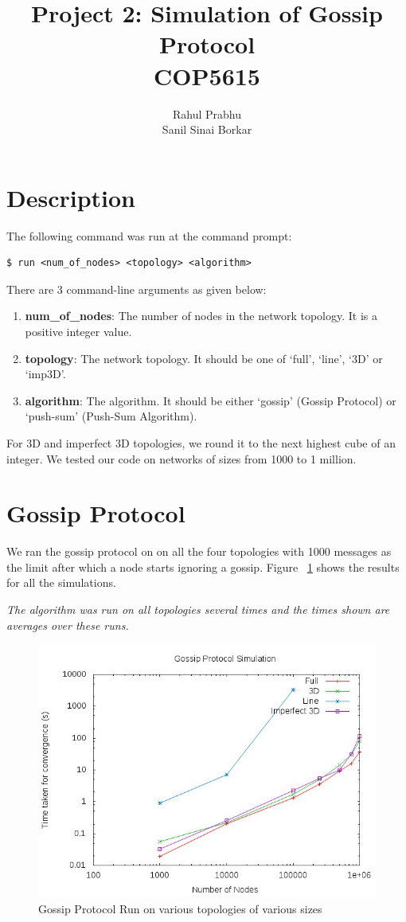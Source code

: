 \documentclass[11pt]{article}
\title{\textbf{Project 2: Simulation of Gossip Protocol\\COP5615}}
\author{Rahul Prabhu\\
		Sanil Sinai Borkar}
\date{}
\begin{document}
\maketitle
\section{Description}

The following command was run at the command prompt:
\begin{lstlisting}
$ run <num_of_nodes> <topology> <algorithm>
\end{lstlisting}


There are 3 command-line arguments as given below:
\begin{enumerate}
\item \textbf{num\_of\_nodes}: The number of nodes in the network topology. It is a positive integer value.
\item \textbf{topology}: The network topology. It should be one of `full', `line', `3D' or `imp3D'.
\item \textbf{algorithm}: The algorithm. It should be either `gossip' (Gossip Protocol) or `push-sum' (Push-Sum Algorithm).
\end{enumerate}

For 3D and imperfect 3D topologies, we round it to the next highest cube of an integer. We tested our code on networks of sizes from 1000 to 1 million.

\section{Gossip Protocol}
We ran the gossip protocol on on all the four topologies with 1000 messages as the limit after which a node starts ignoring a gossip. Figure ~\ref{gossipresults} shows the results for all the simulations. 

\textit{The algorithm was run on all topologies several times and the times shown are averages over these runs.}

\begin{figure}[h]
    \includegraphics[scale=0.75]{Gossip.jpg}
    \caption{Gossip Protocol Run on various topologies of various sizes}
    \label{gossipresults}
\end{figure}
\end{document}
